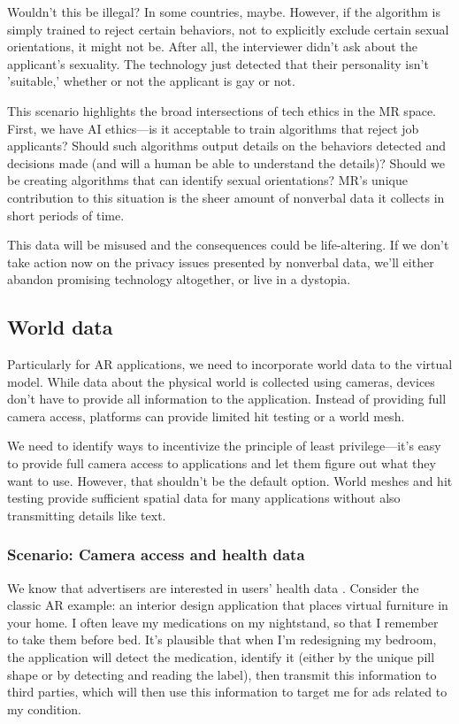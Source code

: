 Wouldn't this be illegal? In some countries, maybe. However, if the algorithm is simply trained to reject certain behaviors, not to explicitly exclude certain sexual orientations, it might not be. After all, the interviewer didn't ask about the applicant's sexuality. The technology just detected that their personality isn't 'suitable,' whether or not the applicant is gay or not.

This scenario highlights the broad intersections of tech ethics in the MR space. First, we have AI ethics---is it acceptable to train algorithms that reject job applicants? Should such algorithms output details on the behaviors detected and decisions made (and will a human be able to understand the details)? Should we be creating algorithms that can identify sexual orientations? MR's unique contribution to this situation is the sheer amount of nonverbal data it collects in short periods of time.

This data will be misused and the consequences could be life-altering. If we don't take action now on the privacy issues presented by nonverbal data, we'll either abandon promising technology altogether, or live in a dystopia.


\subsection{World data}

Particularly for AR applications, we need to incorporate world data to the virtual model. While data about the physical world is collected using cameras, devices don't have to provide all information to the application. Instead of providing full camera access, platforms can provide limited hit testing or a world mesh.

We need to identify ways to incentivize the principle of least privilege---it's easy to provide full camera access to applications and let them figure out what they want to use. However, that shouldn't be the default option. World meshes and hit testing provide sufficient spatial data for many applications without also transmitting details like text.

\subsubsection{Scenario: Camera access and health data}\label{sec:data:world:camera}

We know that advertisers are interested in users' health data \cite{jeong2019insurers}. Consider the classic AR example: an interior design application that places virtual furniture in your home. I often leave my medications on my nightstand, so that I remember to take them before bed. It's plausible that when I'm redesigning my bedroom, the application will detect the medication, identify it (either by the unique pill shape or by detecting and reading the label), then transmit this information to third parties, which will then use this information to target me for ads related to my condition.

